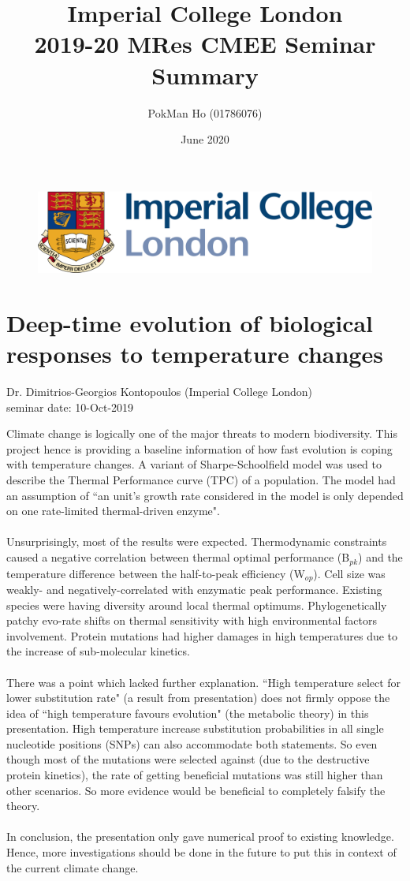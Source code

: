 \documentclass{article}
\title{Imperial College London\\2019-20 MRes CMEE Seminar Summary}
\author{PokMan Ho (01786076)}
\date{June 2020}
\begin{document}
\maketitle
\tableofcontents
\begin{figure}
    \centering
    \includegraphics[width=.5\linewidth]{icl.png}
\end{figure}
\clearpage
    \section{Deep-time evolution of biological responses to temperature changes}
    \begin{flushright}
        \large{Dr. Dimitrios-Georgios Kontopoulos (Imperial College London)}\\
        seminar date: 10-Oct-2019
    \end{flushright}
    Climate change is logically one of the major threats to modern biodiversity.  This project hence is providing a baseline information of how fast evolution is coping with temperature changes.  A variant of Sharpe-Schoolfield model was used to describe the Thermal Performance curve (TPC) of a population.  The model had an assumption of ``an unit's growth rate considered in the model is only depended on one rate-limited thermal-driven enzyme".\\\\
    Unsurprisingly, most of the results were expected.  Thermodynamic constraints caused a negative correlation between thermal optimal performance (B$_{pk}$) and the temperature difference between the half-to-peak efficiency (W$_{op}$).  Cell size was weakly- and negatively-correlated with enzymatic peak performance.  Existing species were having diversity around local thermal optimums.  Phylogenetically patchy evo-rate shifts on thermal sensitivity with high environmental factors involvement.  Protein mutations had higher damages in high temperatures due to the increase of sub-molecular kinetics.\\\\
    There was a point which lacked further explanation.  ``High temperature select for lower substitution rate" (a result from presentation) does not firmly oppose the idea of ``high temperature favours evolution" (the metabolic theory) in this presentation.  High temperature increase substitution probabilities in all single nucleotide positions (SNPs) can also accommodate both statements.  So even though most of the mutations were selected against (due to the destructive protein kinetics), the rate of getting beneficial mutations was still higher than other scenarios.  So more evidence would be beneficial to completely falsify the theory.\\\\
    In conclusion, the presentation only gave numerical proof to existing knowledge.  Hence, more investigations should be done in the future to put this in context of the current climate change.
    \clearpage
    
\end{document}
